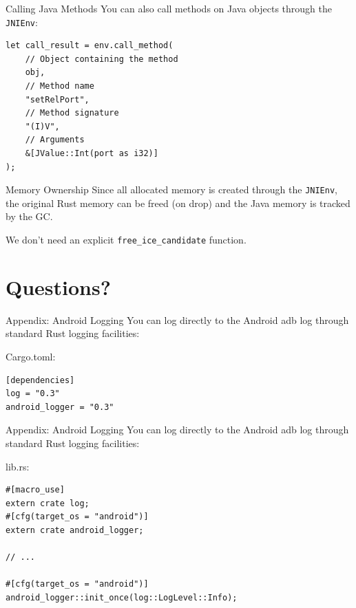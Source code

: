 \documentclass[aspectratio=1610,14pt,t]{beamer}
\begin{document}
\begin{frame}[c,fragile]{Calling Java Methods}
  You can also call methods on Java objects through the \texttt{JNIEnv}:

  \begin{verbatim}
let call_result = env.call_method(
    // Object containing the method
    obj,
    // Method name
    "setRelPort",
    // Method signature
    "(I)V",
    // Arguments
    &[JValue::Int(port as i32)]
);
  \end{verbatim}
\end{frame}

\begin{frame}[c]{Memory Ownership}
  Since all allocated memory is created through the \texttt{JNIEnv}, the
  original Rust memory can be freed (on drop) and the Java memory is tracked by
  the GC.

  We don't need an explicit \texttt{free\_ice\_candidate} function.
\end{frame}


\section{Questions?}


\begin{frame}[c,fragile]{Appendix: Android Logging}
  You can log directly to the Android adb log through standard Rust logging
  facilities:

  Cargo.toml:

  \begin{verbatim}
[dependencies]
log = "0.3"
android_logger = "0.3"
  \end{verbatim}
\end{frame}

\begin{frame}[c,fragile]{Appendix: Android Logging}
  You can log directly to the Android adb log through standard Rust logging
  facilities:

  lib.rs:

  \begin{verbatim}
#[macro_use]
extern crate log;
#[cfg(target_os = "android")]
extern crate android_logger;

// ...

#[cfg(target_os = "android")]
android_logger::init_once(log::LogLevel::Info);
  \end{verbatim}
\end{frame}
\end{document}
